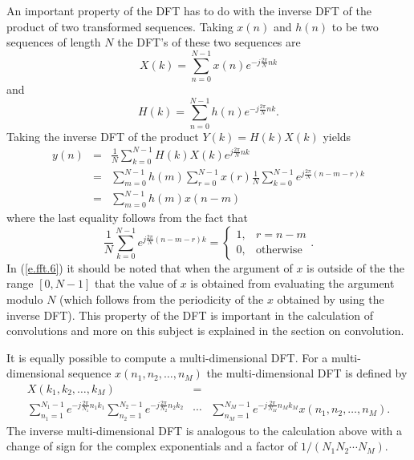 	An important property of the DFT has to do with the
inverse DFT of the product of two transformed sequences.
Taking $x(n)$ and $h(n)$ to be two sequences of length $N$
the DFT's of these two sequences are
%
\begin{equation}
X(k)=\sum_{n=0}^{N-1}x(n)e^{-j\frac{2\pi}{N}nk}
\label{e.fft.4}
\end{equation}
%
and
%
\begin{equation}
H(k)=\sum_{n=0}^{N-1}h(n)e^{-j\frac{2\pi}{N}nk}.
\label{e.fft.5}
\end{equation}
%
Taking the inverse DFT of the product $Y(k)=H(k)X(k)$ yields
%
\begin{eqnarray}
y(n)&=&\frac{1}{N}\sum_{k=0}^{N-1}H(k)X(k)e^{j\frac{2\pi}{N}nk}\nonumber\\
    &=&\sum_{m=0}^{N-1}h(m)\sum_{r=0}^{N-1}x(r)\frac{1}{N}\sum_{k=0}^{N-1}e^{j\frac{2\pi}{N}(n-m-r)k}\nonumber\\
    &=&\sum_{m=0}^{N-1}h(m)x(n-m)
\label{e.fft.6}
\end{eqnarray}
%
where the last equality follows from the fact that
%
\begin{equation}
\frac{1}{N}\sum_{k=0}^{N-1}e^{j\frac{2\pi}{N}(n-m-r)k}=\left\{
   \begin{array}{cc}
                1,&r=n-m\\
                0,&\mbox{otherwise}\end{array}\right..
\label{e.fft.7}
\end{equation}
%
In (\ref{e.fft.6}) it should be noted that when the argument of
$x$ is outside of the the range $[0,N-1]$ that the value of $x$
is obtained from evaluating the argument modulo $N$ (which follows
from the periodicity of the $x$ obtained by using the inverse DFT).
This property of the DFT is important in the calculation of convolutions
and more on this subject is explained in the section on convolution.

	It is equally possible to compute a multi-dimensional DFT.
For a multi-dimensional sequence $x(n_1,n_2,\ldots,n_M)$ the multi-dimensional
DFT is defined by
%
\begin{eqnarray}
X(k_1,k_2,\ldots,k_M)&=&\nonumber\\
\sum_{n_1=1}^{N_1-1}e^{-j\frac{2\pi}{N_1}n_1k_1}\sum_{n_2=1}^{N_2-1}e^{-j\frac{2\pi}{N_2}n_2k_2}&\cdots&\sum_{n_M=1}^{N_M-1}e^{-j\frac{2\pi}{N_M}n_Mk_M}x(n_1,n_2,\ldots,n_M).
\end{eqnarray}
%
The inverse multi-dimensional DFT is analogous to the calculation above
 with a change of sign for the complex exponentials
and a factor of $1/(N_1N_2\cdots N_M)$.

